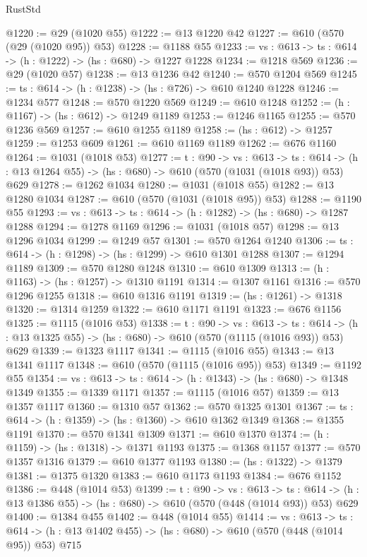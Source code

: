 \begin{lexlean}{RustStd}
\begin{coremodule}
@1220 := @29 (@1020 @55)
@1222 := @13 @1220 @42
@1227 := @610 (@570 (@29 (@1020 @95)) @53)
@1228 := @1188 @55
@1233 := {vs : @613} -> {ts : @614} -> (h : @1222) -> (hs : @680) -> @1227 @1228
@1234 := @1218 @569
@1236 := @29 (@1020 @57)
@1238 := @13 @1236 @42
@1240 := @570 @1204 @569
@1245 := {ts : @614} -> (h : @1238) -> (hs : @726) -> @610 @1240 @1228
@1246 := @1234 @577
@1248 := @570 @1220 @569
@1249 := @610 @1248
@1252 := (h : @1167) -> (hs : @612) -> @1249 @1189
@1253 := @1246 @1165
@1255 := @570 @1236 @569
@1257 := @610 @1255 @1189
@1258 := (hs : @612) -> @1257
@1259 := @1253 @609
@1261 := @610 @1169 @1189
@1262 := @676 @1160
@1264 := @1031 (@1018 @53)
@1277 := {t : @90} ->
  {vs : @613} ->
  {ts : @614} -> (h : @13 @1264 @55) -> (hs : @680) -> @610 (@570 (@1031 (@1018 @93)) @53) @629
@1278 := @1262 @1034
@1280 := @1031 (@1018 @55)
@1282 := @13 @1280 @1034
@1287 := @610 (@570 (@1031 (@1018 @95)) @53)
@1288 := @1190 @55
@1293 := {vs : @613} -> {ts : @614} -> (h : @1282) -> (hs : @680) -> @1287 @1288
@1294 := @1278 @1169
@1296 := @1031 (@1018 @57)
@1298 := @13 @1296 @1034
@1299 := @1249 @57
@1301 := @570 @1264 @1240
@1306 := {ts : @614} -> (h : @1298) -> (hs : @1299) -> @610 @1301 @1288
@1307 := @1294 @1189
@1309 := @570 @1280 @1248
@1310 := @610 @1309
@1313 := (h : @1163) -> (hs : @1257) -> @1310 @1191
@1314 := @1307 @1161
@1316 := @570 @1296 @1255
@1318 := @610 @1316 @1191
@1319 := (hs : @1261) -> @1318
@1320 := @1314 @1259
@1322 := @610 @1171 @1191
@1323 := @676 @1156
@1325 := @1115 (@1016 @53)
@1338 := {t : @90} ->
  {vs : @613} ->
  {ts : @614} -> (h : @13 @1325 @55) -> (hs : @680) -> @610 (@570 (@1115 (@1016 @93)) @53) @629
@1339 := @1323 @1117
@1341 := @1115 (@1016 @55)
@1343 := @13 @1341 @1117
@1348 := @610 (@570 (@1115 (@1016 @95)) @53)
@1349 := @1192 @55
@1354 := {vs : @613} -> {ts : @614} -> (h : @1343) -> (hs : @680) -> @1348 @1349
@1355 := @1339 @1171
@1357 := @1115 (@1016 @57)
@1359 := @13 @1357 @1117
@1360 := @1310 @57
@1362 := @570 @1325 @1301
@1367 := {ts : @614} -> (h : @1359) -> (hs : @1360) -> @610 @1362 @1349
@1368 := @1355 @1191
@1370 := @570 @1341 @1309
@1371 := @610 @1370
@1374 := (h : @1159) -> (hs : @1318) -> @1371 @1193
@1375 := @1368 @1157
@1377 := @570 @1357 @1316
@1379 := @610 @1377 @1193
@1380 := (hs : @1322) -> @1379
@1381 := @1375 @1320
@1383 := @610 @1173 @1193
@1384 := @676 @1152
@1386 := @448 (@1014 @53)
@1399 := {t : @90} ->
  {vs : @613} ->
  {ts : @614} -> (h : @13 @1386 @55) -> (hs : @680) -> @610 (@570 (@448 (@1014 @93)) @53) @629
@1400 := @1384 @455
@1402 := @448 (@1014 @55)
@1414 := {vs : @613} ->
  {ts : @614} -> (h : @13 @1402 @455) -> (hs : @680) -> @610 (@570 (@448 (@1014 @95)) @53) @715

\end{coremodule}
\end{lexlean}
